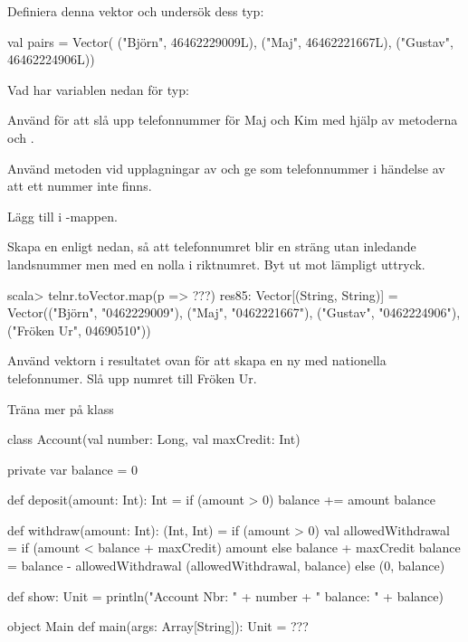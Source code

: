 {{\Subtask Definiera denna vektor och undersök dess typ:
\begin{Code}
val pairs = Vector(
  ("Björn", 46462229009L), 
  ("Maj", 46462221667L), 
  ("Gustav", 46462224906L))
\end{Code}

\Subtask Vad har variablen  nedan för typ: \\ 

\Subtask Använd  för att slå upp telefonnummer för Maj och Kim med hjälp av metoderna  och .

\Subtask Använd metoden  vid upplagningar av  och ge  som telefonnummer i händelse av att ett nummer inte finns. 

\Subtask Lägg till  i -mappen.

\Subtask Skapa en  enligt nedan, så att telefonnumret blir en sträng utan inledande landsnummer men med en nolla i riktnumret. Byt ut  mot lämpligt uttryck.
\begin{REPL}
scala> telnr.toVector.map(p => ???) 
res85: Vector[(String, String)] = Vector(("Björn", "0462229009"), ("Maj", 
"0462221667"), ("Gustav", "0462224906"), ("Fröken Ur", 04690510"))

\end{REPL}

\Subtask Använd vektorn i resultatet ovan för att skapa en ny  med nationella telefonnumer. Slå upp numret till Fröken Ur.

\ExtraTasks %


\Task \TODO Träna mer på  klass

\begin{Code}
class Account(val number: Long, val maxCredit: Int){ 
  private var balance = 0
  
  def deposit(amount: Int): Int = { 
    if (amount > 0) {balance += amount}
    balance
  }
  
  def withdraw(amount: Int): (Int, Int) = if (amount > 0) { 
    val allowedWithdrawal = 
      if (amount < balance + maxCredit) amount 
      else balance + maxCredit 
    balance = balance - allowedWithdrawal
    (allowedWithdrawal, balance)
  } else (0, balance)
  
  def show: Unit = 
    println("Account Nbr: " + number + " balance: " + balance) 
}

object Main {
  def main(args: Array[String]): Unit = {
    ???
  }
}
\end{Code}



}}
